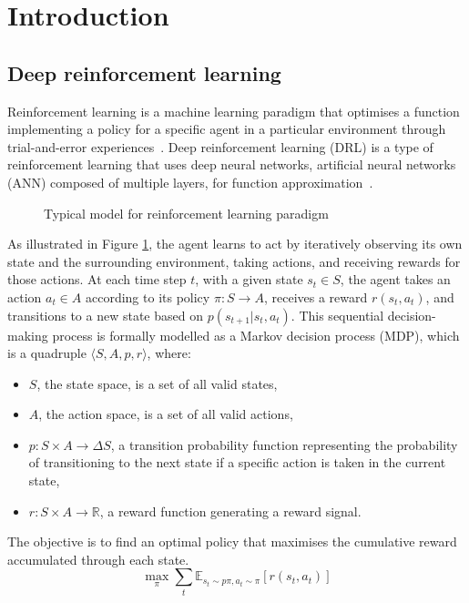 \section{Introduction}

\subsection{Deep reinforcement learning}

Reinforcement learning is a machine learning paradigm that optimises a function implementing a policy for a specific agent in a particular environment through trial-and-error experiences~\cite{ref:spinning-up}. Deep reinforcement learning (DRL) is a type of reinforcement learning that uses deep neural networks, artificial neural networks (ANN) composed of multiple layers, for function approximation~\cite{ref:dqn}.

\begin{figure}[htbp]
\centering

\caption{Typical model for reinforcement learning paradigm \cite{ref:spec-report}}
\label{fig:agent-env-interaction}
\end{figure}

As illustrated in Figure \ref{fig:agent-env-interaction}, the agent learns to act by iteratively observing its own state and the surrounding environment, taking actions, and receiving rewards for those actions. At each time step $t$, with a given state $s_t \in S$, the agent takes an action $a_t \in A$ according to its policy $\pi \colon S \to A$, receives a reward $r(s_t, a_t)$, and transitions to a new state based on $p(s_{t+1}|s_t, a_t)$. This sequential decision-making process is formally modelled as a Markov decision process (MDP), which is a quadruple $\langle S, A, p, r \rangle$, where:
\begin{itemize}
\item $S$, the state space, is a set of all valid states,
\item $A$, the action space, is a set of all valid actions,
\item $p \colon S \times A \to \Delta S$, a transition probability function representing the probability of transitioning to the next state if a specific action is taken in the current state,
\item $r \colon S \times A \to \mathbb{R}$, a reward function generating a reward signal.
\end{itemize}
The objective is to find an optimal policy that maximises the cumulative reward accumulated through each state.
\begin{displaymath}
\max_{\pi} \sum_{t} \mathbb{E}_{s_t \sim p\pi, a_t \sim \pi} \left[ r(s_t,a_t) \right]
\end{displaymath}

